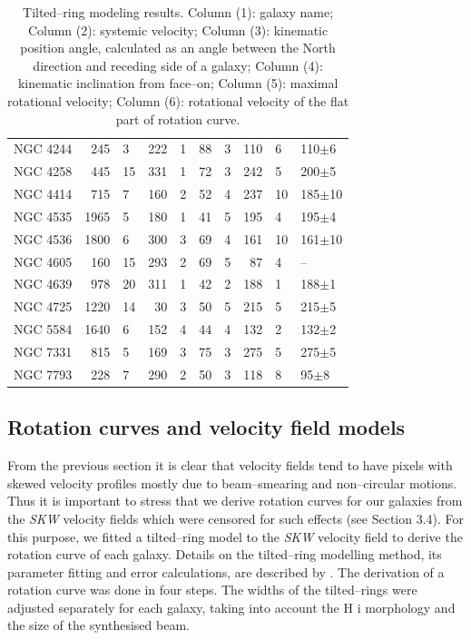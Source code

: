 \documentclass[usenatbib,useAMS]{mnras}
\begin{document}
\begin{table}
\begin{tabular}{lr@{$\pm$}lr@{$\pm$}lr@{$\pm$}lr@{$\pm$}ll}
NGC 4244	&245&3	&222&1	 &88&3      &110&6	      &110$\pm$6	\\
NGC 4258	&445&15	&331&1	 &72&3	     &242&5	&200$\pm$5	\\
NGC 4414	&715&7	&160&2	 &52&4	     &237&10	&185$\pm$10	\\
NGC 4535	&1965&5	&180&1	 &41&5      &195&4	      &195$\pm$4	\\
NGC 4536	&1800&6	&300&3	 &69&4	     &161&10	&161$\pm$10	\\
NGC 4605	&160&15	&293&2	 &69&5	      &87&4       &  --  \\
NGC 4639	&978&20	&311&1	 &42&2	     &188&1	&188$\pm$1	\\
NGC 4725	&1220&14      &30&3	 &50&5    &215&5	      &215$\pm$5	\\
NGC 5584	&1640&6	&152&4	 &44&4    &132&2	      &132$\pm$2	\\
NGC 7331	&815&5	&169&3	 &75&3	     &275&5	&275$\pm$5	\\
NGC 7793	&228&7	&290&2	 &50&3	     &118&8	      &95$\pm$8   \\
\hline
\end{tabular}
\caption{Tilted--ring modeling results. 
Column (1): galaxy name;
Column (2): systemic velocity;
Column (3): kinematic position angle, calculated as an angle between the North direction and receding side of a galaxy;
Column (4): kinematic inclination from face--on;
Column (5): maximal rotational velocity;
Column (6): rotational velocity of the flat part of rotation curve.
}
\label{tbl_rot}
\end{table}



\subsection{Rotation curves and velocity field models }

 From the previous section it is clear that velocity fields tend to
have pixels with skewed velocity profiles mostly due to beam--smearing
and non--circular motions.  Thus it is important to stress that we
derive rotation curves for our galaxies from the {\it SKW} velocity
fields which were censored for such effects (see Section 3.4). For this
purpose, we fitted a tilted--ring model to the {\it SKW} velocity field
to derive the rotation curve of each galaxy. Details on the
tilted--ring modelling method, its parameter fitting and error
calculations, are described by \citep{begeman89}. The derivation of a
rotation curve was done in four steps.  The widths of the tilted--rings
were adjusted separately for each galaxy, taking into account the H{\sc
i} morphology and the size of the synthesised beam. 
\end{document}
